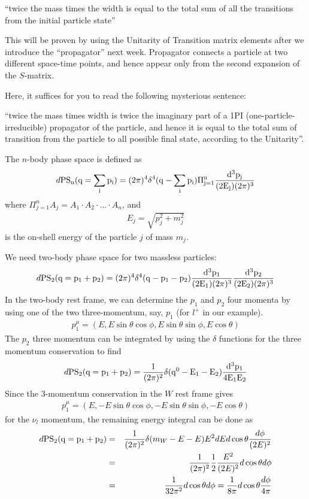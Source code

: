 \documentclass[12pt]{article}
\def\PS{\rm PS}
\begin{document}
``twice the mass times the width is equal to the total sum of all the
transitions from the initial particle state''

This will be proven by using the Unitarity of Transition matrix elements
after we introduce the ``propagator'' next week.  Propagator connects a
particle at two different space-time points, and hence appear only from
the second expansion of the $S$-matrix.

Here, it suffices for you to read the following mysterious sentence:

``twice the mass times width is twice the imaginary part of a 1PI
(one-particle-irreducible) propagator of the particle, and hence it is
equal to the total sum of transition from the particle to all possible
final state, according to the Unitarity''.

The $n$-body phase space is defined as
\begin{eqnarray}
  d\PS_n(q=\sum_i p_i)
= (2\pi)^4 \delta^4(q-\sum_i p_i)
                 \Pi_{j=1}^{n} \frac{d^3p_j}{(2E_j)(2\pi)^3} \label{eq.19_60}
\end{eqnarray}
where $\Pi_{j=1}^{n} A_j = A_1 \cdot A_2 \cdot ... \cdot A_n$, and
\begin{eqnarray}
  E_j = \sqrt{ p_j^2 + m_j^2 } \label{19_61}
\end{eqnarray}
is the on-shell energy of the particle $j$ of mass $m_j$.

We need two-body phase space for two massless particles:
\begin{eqnarray}
  d\PS_2(q=p_1+p_2)
= (2\pi)^4 \delta^4(q-p_1-p_2)
  \frac{ d^3p_1}{(2E_1)(2\pi)^3 }\frac{ d^3p_2}{(2E_2)(2\pi)^3 } \label{eq.19_62}
\end{eqnarray}
In the two-body rest frame, we can determine the $p_1$ and $p_2$ four
momenta by using one of the two three-momentum, say, $p_1$ (for $l^+$ in
our example).
\begin{eqnarray}
  p_1^\mu = (E, E\sin\theta \cos\phi, E\sin\theta\sin\phi, E\cos\theta)\label{eq.19_63}
\end{eqnarray}
The $p_2$ three momentum can be integrated by using the $\delta$
functions for the three momentum conservation to find
\begin{eqnarray}
  d\PS_2(q=p_1+p_2)
= \frac{1}{(2\pi)^2} \delta(q^0-E_1-E_2) \frac{d^3p_1}{4E_1 E_2}\label{eq.19_64}
\end{eqnarray}
Since the $3$-momentum conservation in the $W$ rest frame gives
\begin{eqnarray}
  p_1^\mu = (E, -E\sin\theta \cos\phi, -E\sin\theta\sin\phi, -E\cos\theta)\label{eq.19_65}
\end{eqnarray}
for the $\nu_l$ momentum, the remaining energy integral can be done as
\begin{eqnarray}
  d\PS_2(q=p_1+p_2)
&=& \frac{1}{(2\pi)^2} \delta(m_W-E-E) E^2dE d\cos\theta \frac{d\phi}{(2E)^2} \\
&=& \frac{1}{(2\pi)^2}\frac{1}{2} \frac{E^2}{(2E)^2} d\cos\theta d\phi \\
&=& \frac{1}{32\pi^2} d\cos\theta d\phi
= \frac{1}{8\pi} d\cos\theta \frac{d\phi }{4\pi} \label{eq.19_66}
\end{eqnarray}
\end{document}
